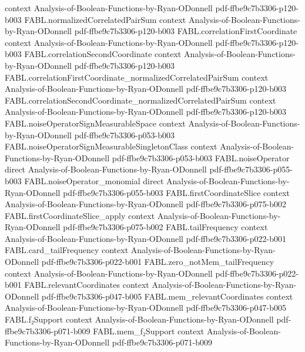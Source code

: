 \begin{theorem}
  {context}
  {Analysis-of-Boolean-Functions-by-Ryan-ODonnell}
  {pdf-ffbe9c7b3306-p120-b003}
\proofstep
  {FABL.normalizedCorrelatedPairSum}
  {context}
  {Analysis-of-Boolean-Functions-by-Ryan-ODonnell}
  {pdf-ffbe9c7b3306-p120-b003}
\proofstep
  {FABL.correlationFirstCoordinate}
  {context}
  {Analysis-of-Boolean-Functions-by-Ryan-ODonnell}
  {pdf-ffbe9c7b3306-p120-b003}
\proofstep
  {FABL.correlationSecondCoordinate}
  {context}
  {Analysis-of-Boolean-Functions-by-Ryan-ODonnell}
  {pdf-ffbe9c7b3306-p120-b003}
\proofstep
  {FABL.correlationFirstCoordinate_normalizedCorrelatedPairSum}
  {context}
  {Analysis-of-Boolean-Functions-by-Ryan-ODonnell}
  {pdf-ffbe9c7b3306-p120-b003}
\proofstep
  {FABL.correlationSecondCoordinate_normalizedCorrelatedPairSum}
  {context}
  {Analysis-of-Boolean-Functions-by-Ryan-ODonnell}
  {pdf-ffbe9c7b3306-p120-b003}
\proofstep
  {FABL.noiseOperatorSignMeasurableSpace}
  {context}
  {Analysis-of-Boolean-Functions-by-Ryan-ODonnell}
  {pdf-ffbe9c7b3306-p053-b003}
\proofstep
  {FABL.noiseOperatorSignMeasurableSingletonClass}
  {context}
  {Analysis-of-Boolean-Functions-by-Ryan-ODonnell}
  {pdf-ffbe9c7b3306-p053-b003}
\proofstep
  {FABL.noiseOperator}
  {direct}
  {Analysis-of-Boolean-Functions-by-Ryan-ODonnell}
  {pdf-ffbe9c7b3306-p055-b003}
\proofstep
  {FABL.noiseOperator_monomial}
  {direct}
  {Analysis-of-Boolean-Functions-by-Ryan-ODonnell}
  {pdf-ffbe9c7b3306-p055-b003}
\proofstep
  {FABL.firstCoordinateSlice}
  {context}
  {Analysis-of-Boolean-Functions-by-Ryan-ODonnell}
  {pdf-ffbe9c7b3306-p075-b002}
\proofstep
  {FABL.firstCoordinateSlice_apply}
  {context}
  {Analysis-of-Boolean-Functions-by-Ryan-ODonnell}
  {pdf-ffbe9c7b3306-p075-b002}
\proofstep
  {FABL.tailFrequency}
  {context}
  {Analysis-of-Boolean-Functions-by-Ryan-ODonnell}
  {pdf-ffbe9c7b3306-p022-b001}
\proofstep
  {FABL.card_tailFrequency}
  {context}
  {Analysis-of-Boolean-Functions-by-Ryan-ODonnell}
  {pdf-ffbe9c7b3306-p022-b001}
\proofstep
  {FABL.zero_notMem_tailFrequency}
  {context}
  {Analysis-of-Boolean-Functions-by-Ryan-ODonnell}
  {pdf-ffbe9c7b3306-p022-b001}
\proofstep
  {FABL.relevantCoordinates}
  {context}
  {Analysis-of-Boolean-Functions-by-Ryan-ODonnell}
  {pdf-ffbe9c7b3306-p047-b005}
\proofstep
  {FABL.mem_relevantCoordinates}
  {context}
  {Analysis-of-Boolean-Functions-by-Ryan-ODonnell}
  {pdf-ffbe9c7b3306-p047-b005}
\proofstep
  {FABL.f₂Support}
  {context}
  {Analysis-of-Boolean-Functions-by-Ryan-ODonnell}
  {pdf-ffbe9c7b3306-p071-b009}
\proofstep
  {FABL.mem_f₂Support}
  {context}
  {Analysis-of-Boolean-Functions-by-Ryan-ODonnell}
  {pdf-ffbe9c7b3306-p071-b009}

\end{theorem}
